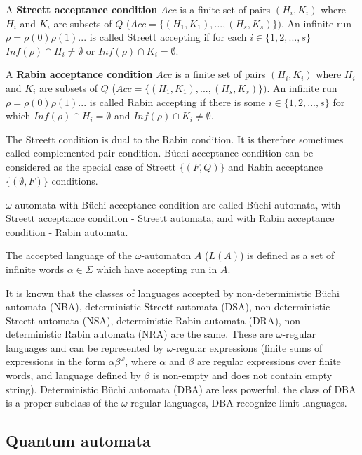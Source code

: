 \documentclass{llncs}
\begin{document}
\begin{definition}
A \textbf{Streett acceptance condition} $Acc$ is a finite set of pairs $(H_i,K_i)$ where $H_i$ and $K_i$ are subsets of $Q$ ($Acc=\{(H_1,K_1),...,(H_s,K_s)\})$. An infinite run $\rho=\rho(0)\rho(1)...$ is called Streett accepting if for each $i \in \{1, 2, ..., s\}$ $Inf(\rho)\cap H_i \neq \emptyset$ or $Inf(\rho)\cap K_i = \emptyset$.
\end{definition}

\begin{definition}
A \textbf{Rabin acceptance condition} $Acc$ is a finite set of pairs $(H_i,K_i)$ where $H_i$ and $K_i$ are subsets of $Q$ ($Acc=\{(H_1,K_1),...,(H_s,K_s)\})$. An infinite run $\rho=\rho(0)\rho(1)...$ is called Rabin accepting if there is some $i \in \{1, 2, ..., s\}$ for which $Inf(\rho)\cap H_i = \emptyset$ and $Inf(\rho)\cap K_i \neq \emptyset$.
\end{definition}

The Streett condition is dual to the Rabin condition. It is therefore sometimes called complemented pair condition. B\"uchi acceptance condition can be considered as the special case of Streett $\{(F, Q)\}$ and Rabin acceptance $\{(\emptyset, F)\}$ conditions. 

$\omega$-automata with B\"uchi acceptance condition are called B\"uchi automata, with Streett acceptance condition - Streett automata, and with Rabin acceptance condition - Rabin automata. 

The accepted language of the $\omega$-automaton $A$ ($L(A)$) is defined as a set of infinite words $\alpha \in \Sigma$ which have accepting run in $A$.

It is known that the classes of languages accepted by non-deterministic B\"uchi automata (NBA), deterministic Streett automata (DSA), non-deterministic Streett automata (NSA), deterministic Rabin automata (DRA), non-deterministic Rabin automata (NRA) are the same. These are $\omega$-regular languages and can be represented by $\omega$-regular expressions (finite sums of expressions in the form $\alpha \beta^{\omega}$, where $\alpha$ and $\beta$ are regular expressions over finite words, and language defined by $\beta$ is non-empty and does not contain empty string). Deterministic B\"uchi automata (DBA) are less powerful, the class of DBA is a proper subclass of the $\omega$-regular languages, DBA recognize limit languages.

\bigskip

\subsection{Quantum automata}
\end{document}
